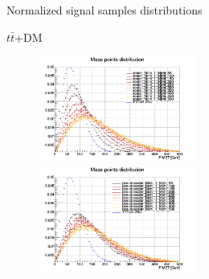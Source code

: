 \documentclass[8pt]{beamer}
\begin{document}
\begin{frame}{Normalized signal samples distributions}
\vspace{-5pt}
\begin{block}{\centering $t \bar t$+DM}\end{block} \vspace{-10pt}
\begin{figure}[htbp]
\centering
\begin{minipage}[b]{.49\textwidth}
\begin{center}
\includegraphics[width=5.2cm, height=3.5cm]{figs/scalarMETmChi1Norm.png}
\end{center}
\end{minipage}\hfill
\begin{minipage}[b]{.49\textwidth}
\begin{center}
\includegraphics[width=5.2cm, height=3.5cm]{figs/pseudoscalarMETmChi1Norm.png}
\end{center}
\end{minipage} \hfill
\end{figure} \vfill
\end{frame}
\end{document}
